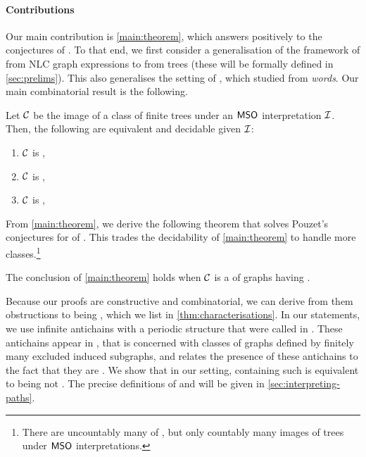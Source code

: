\paragraph*{Contributions} \AP Our main contribution is \cref{main:theorem},
which answers positively to the conjectures of \cite{LOPEZ24}. To that end, we
first consider a generalisation of the framework of \cite{DRT10} from NLC graph
expressions to  from trees (these will be formally
defined in \cref{sec:prelims}). This also generalises the setting of
\cite{LOPEZ24}, which studied  from \emph{words}. Our
main combinatorial result is the following.

\begin{theorem}[name={},restate=main:theorem]
  \label{main:theorem}
  Let $\Cls$ be the image of a class of finite trees 
  under an $\mathsf{MSO}$ interpretation $\mathcal{I}$. Then, the following are equivalent
  and decidable given $\mathcal{I}$:
  \begin{enumerate}
    \item $\Cls$ is ,
    \item $\Cls$ is ,
    \item $\Cls$ is ,
  \end{enumerate}
\end{theorem}

From \cref{main:theorem}, we derive the following theorem that solves
Pouzet's conjectures for  of .
This trades the decidability of \cref{main:theorem} to handle more
classes.\footnote{There are uncountably many  of
, but only countably many images of trees under $\mathsf{MSO}$
interpretations.}

\begin{theorem}[name={},restate=main:corollary]
  \label{main:corollary}
  The conclusion of \cref{main:theorem}
  holds when $\Cls$ is a  of graphs having .
\end{theorem}


Because our proofs are constructive and combinatorial, we can derive from them
obstructions to being , which we list in
\cref{thm:characterisations}. In our statements, we use infinite antichains
with a periodic structure that were called  in
\cite[Section 7]{ALM17}. These antichains appear in \cite[Conjecture 2]{ALM17},
that is concerned with classes of graphs defined by finitely many excluded
induced subgraphs, and relates the presence of these antichains to the fact
that they are . We show that in our setting, containing
such  is equivalent to being not
. The precise definitions of 
and  will be given in \cref{sec:interpreting-paths}.


